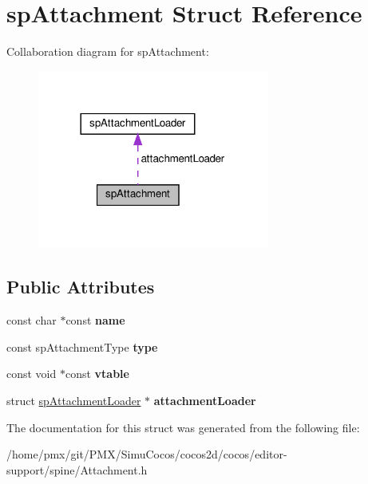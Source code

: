 \hypertarget{structspAttachment}{}\section{sp\+Attachment Struct Reference}
\label{structspAttachment}


Collaboration diagram for sp\+Attachment\+:
\nopagebreak
\begin{figure}[H]
\begin{center}
\leavevmode
\includegraphics[width=216pt]{structspAttachment__coll__graph}
\end{center}
\end{figure}
\subsection*{Public Attributes}
\begin{DoxyCompactItemize}
\item 
\mbox{\label{structspAttachment_ac9362417d681eab98cfc217741ecaf32}} 
const char $\ast$const {\bfseries name}
\item 
\mbox{\label{structspAttachment_aa453f77d31219e036dd25d35b61badec}} 
const sp\+Attachment\+Type {\bfseries type}
\item 
\mbox{\label{structspAttachment_a0a52fd1b1b1bf0737e3a8901678a0737}} 
const void $\ast$const {\bfseries vtable}
\item 
\mbox{\label{structspAttachment_a3c70e7881828f27c3a68a74a7d196e03}} 
struct \hyperlink{structspAttachmentLoader}{sp\+Attachment\+Loader} $\ast$ {\bfseries attachment\+Loader}
\end{DoxyCompactItemize}


The documentation for this struct was generated from the following file\+:\begin{DoxyCompactItemize}
\item 
/home/pmx/git/\+P\+M\+X/\+Simu\+Cocos/cocos2d/cocos/editor-\/support/spine/Attachment.\+h\end{DoxyCompactItemize}
